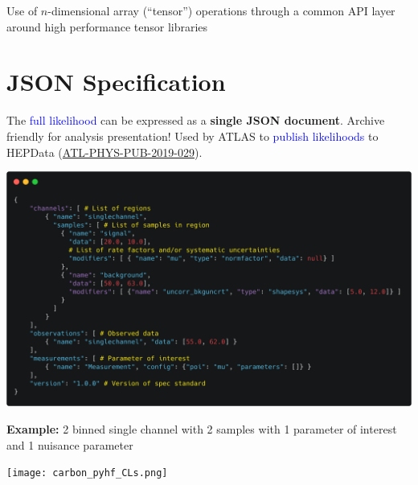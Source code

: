 \documentclass[princeton,portrait]{a0poster}
\begin{document}
\begin{multicols}{2}
 \noindent Use of $n$-dimensional array (``tensor'') operations through a common API layer around high performance tensor libraries

 \section*{\LARGE\color{MediumBlue} JSON Specification}
 The \textcolor{blue}{full likelihood} can be expressed as a \textbf{single JSON document}.
 Archive friendly for analysis presentation! Used by ATLAS to \textcolor{blue}{publish likelihoods} to HEPData (\textcolor{blue}{\href{https://atlas.web.cern.ch/Atlas/GROUPS/PHYSICS/PUBNOTES/ATL-PHYS-PUB-2019-029/}{ATL-PHYS-PUB-2019-029}}).
 \vspace{0.5em}
 \begin{center}
  \href{https://raw.githubusercontent.com/scikit-hep/pyhf/master/docs/examples/json/2-bin_1-channel.json}{\includegraphics[width=0.7\linewidth]{carbon_JSON_spec_annotated.png}}
 \end{center}
 \vspace{-1em}
 \begin{center}
  {\small\textbf{Example:} 2 binned single channel with 2 samples with 1 parameter of interest and 1 nuisance parameter}
 \end{center}
 \begin{center}
  \texttt{[image: carbon\_pyhf\_CLs.png]}
 \end{center}
\end{multicols}
\end{document}
